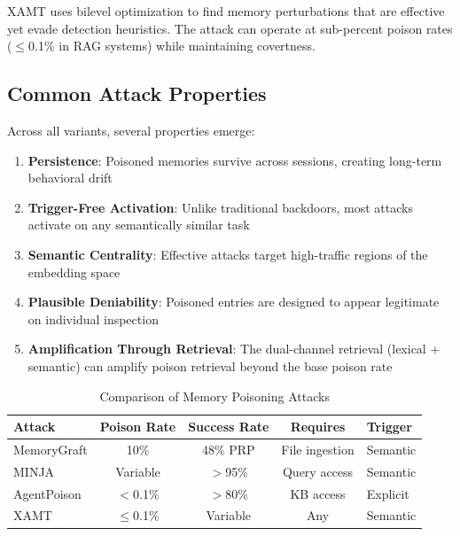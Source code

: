 XAMT \cite{xamt2025} uses bilevel optimization to find memory perturbations that are effective yet evade detection heuristics. The attack can operate at sub-percent poison rates ($\leq$0.1\% in RAG systems) while maintaining covertness.

\subsection{Common Attack Properties}

Across all variants, several properties emerge:

\begin{enumerate}
    \item \textbf{Persistence}: Poisoned memories survive across sessions, creating long-term behavioral drift
    \item \textbf{Trigger-Free Activation}: Unlike traditional backdoors, most attacks activate on any semantically similar task
    \item \textbf{Semantic Centrality}: Effective attacks target high-traffic regions of the embedding space
    \item \textbf{Plausible Deniability}: Poisoned entries are designed to appear legitimate on individual inspection
    \item \textbf{Amplification Through Retrieval}: The dual-channel retrieval (lexical + semantic) can amplify poison retrieval beyond the base poison rate
\end{enumerate}

\begin{table}[h]
\centering
\caption{Comparison of Memory Poisoning Attacks}
\begin{tabular}{lcccl}
\toprule
\textbf{Attack} & \textbf{Poison Rate} & \textbf{Success Rate} & \textbf{Requires} & \textbf{Trigger} \\
\midrule
MemoryGraft & 10\% & 48\% PRP & File ingestion & Semantic \\
MINJA & Variable & $>$95\% & Query access & Semantic \\
AgentPoison & $<$0.1\% & $>$80\% & KB access & Explicit \\
XAMT & $\leq$0.1\% & Variable & Any & Semantic \\
\bottomrule
\end{tabular}
\label{tab:attack-comparison}
\end{table}

